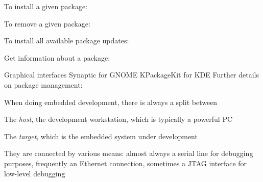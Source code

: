   \startitemize
  \item To install a given package:\\
  \item To remove a given package:\\
  \item To install all available package updates:\\
  \item Get information about a package:\\
  \item Graphical interfaces
    Synaptic for GNOME
    KPackageKit for KDE
  \stopitemize
  Further details on package management:\\

  \startitemize
  \item When doing embedded development, there is always a split between
    \startitemize
    \item The {\em host}, the development workstation, which is
      typically a powerful PC
    \item The {\em target}, which is the embedded system under
      development
    \stopitemize
  \item They are connected by various means: almost always a serial
    line for debugging purposes, frequently an Ethernet connection,
    sometimes a JTAG interface for low-level debugging

  \stopitemize

